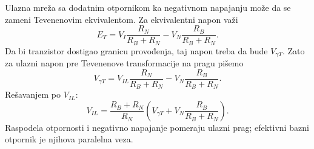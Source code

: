 Ulazna mreža sa dodatnim otpornikom ka negativnom napajanju može da se zameni Tevenenovim ekvivalentom. Za ekvivalentni napon važi
\[E_T=V_I\frac{R_N}{R_B+R_N}-V_N\frac{R_B}{R_B+R_N}.\]
Da bi tranzistor dostigao granicu provođenja, taj napon treba da bude $V_{\gamma T}$. Zato za ulazni napon pre Tevenenove transformacije na pragu pišemo
\[V_{\gamma T}=V_{IL}\frac{R_N}{R_B+R_N}-V_N\frac{R_B}{R_B+R_N}.\]
Rešavanjem po $V_{IL}$:
\[V_{IL}=\frac{R_B+R_N}{R_N}\left(V_{\gamma T}+V_N\frac{R_B}{R_B+R_N}\right).\]
Raspodela otpornosti i negativno napajanje pomeraju ulazni prag; efektivni bazni otpornik je njihova paralelna veza.
